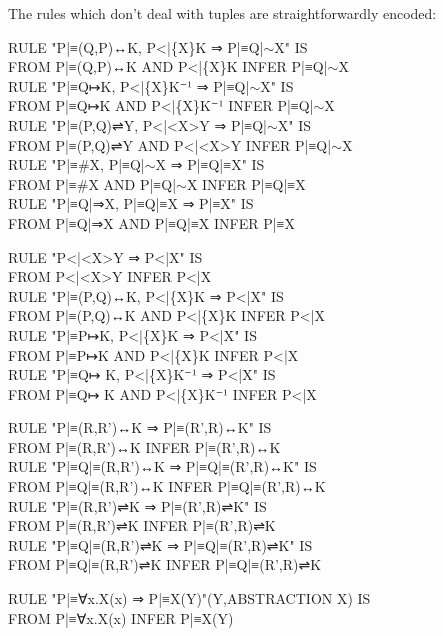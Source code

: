 The rules which don't deal with tuples are straightforwardly encoded:
\begin{japeish}
RULE "P|≡(Q,P)↔K, P<|\{X\}K ⇒ P|≡Q|$\sim$X" IS \\
\tab FROM P|≡(Q,P)↔K AND P<|\{X\}K INFER P|≡Q|$\sim$X\\
RULE "P|≡Q↦K, P<|\{X\}K⁻¹ ⇒ P|≡Q|$\sim$X" IS \\
\tab FROM P|≡Q↦K AND P<|\{X\}K⁻¹ INFER P|≡Q|$\sim$X\\
RULE "P|≡(P,Q)⇌Y, P<|<X>Y ⇒ P|≡Q|$\sim$X" IS \\
\tab FROM P|≡(P,Q)⇌Y AND P<|<X>Y INFER P|≡Q|$\sim$X\\
RULE "P|≡\#X, P|≡Q|$\sim$X ⇒ P|≡Q|≡X" IS \\
\tab FROM P|≡\#X AND P|≡Q|$\sim$X INFER P|≡Q|≡X\\
RULE "P|≡Q|⇒X, P|≡Q|≡X ⇒ P|≡X" IS \\
\tab FROM P|≡Q|⇒X AND P|≡Q|≡X INFER P|≡X
\end{japeish}
\begin{japeish}
RULE "P<|<X>Y ⇒ P<|X" IS \\
\tab FROM P<|<X>Y INFER P<|X\\
RULE "P|≡(P,Q)↔K, P<|\{X\}K ⇒ P<|X" IS \\
\tab FROM P|≡(P,Q)↔K AND P<|\{X\}K INFER P<|X\\
RULE "P|≡P↦K, P<|\{X\}K ⇒ P<|X" IS \\
\tab FROM P|≡P↦K AND P<|\{X\}K INFER P<|X\\
RULE "P|≡Q↦ K, P<|\{X\}K⁻¹ ⇒ P<|X" IS \\
\tab FROM P|≡Q↦ K AND P<|\{X\}K⁻¹ INFER P<|X
\end{japeish}
\begin{japeish}
RULE "P|≡(R,R')↔K ⇒ P|≡(R',R)↔K" IS \\
\tab FROM P|≡(R,R')↔K INFER P|≡(R',R)↔K\\
RULE "P|≡Q|≡(R,R')↔K ⇒ P|≡Q|≡(R',R)↔K" IS \\
\tab FROM P|≡Q|≡(R,R')↔K INFER P|≡Q|≡(R',R)↔K\\
RULE "P|≡(R,R')⇌K ⇒ P|≡(R',R)⇌K" IS \\
\tab FROM P|≡(R,R')⇌K INFER P|≡(R',R)⇌K\\
RULE "P|≡Q|≡(R,R')⇌K ⇒ P|≡Q|≡(R',R)⇌K" IS \\
\tab FROM P|≡Q|≡(R,R')⇌K INFER P|≡Q|≡(R',R)⇌K\\
\end{japeish}
\begin{japeish}
RULE "P|≡∀x.X(x) ⇒ P|≡X(Y)"(Y,ABSTRACTION X) IS \\
\tab FROM P|≡∀x.X(x) INFER P|≡X(Y)
\end{japeish}

